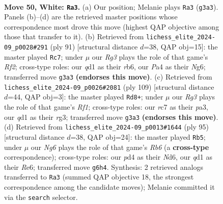 \documentclass[11pt]{article}
\begin{document}
\clearpage

\begin{figure}[p]\centering
\begin{subfigure}{0.46\textwidth}\centering
\resizebox{\linewidth}{!}{%
\newchessgame
\chessboard[
  setfen={6k1/2r3p1/1p4N1/5r2/P2pp3/6R1/5PK1/3q4 w - - 4 50},
  showmover=false,
  pgfstyle=straightmove, color=movearrow, markmove={g3-a3}
]}
\caption{}
\end{subfigure}\hfill
\begin{subfigure}{0.46\textwidth}\centering
\resizebox{\linewidth}{!}{%
\newchessgame
\chessboard[
  setfen={8/1p3rk1/pR4n1/P7/1PP5/6KP/8/8 b - - 0 46},
  showmover=false,
  pgfstyle=straightmove, color=movearrow, markmove={f7-c7}
]}
\caption{}
\end{subfigure}
\\[4pt]
\begin{subfigure}{0.46\textwidth}\centering
\resizebox{\linewidth}{!}{%
\newchessgame
\chessboard[
  setfen={5r1k/5P1p/4r3/4N2P/p2K4/P5R1/2P5/8 b - - 6 55},
  showmover=false,
  pgfstyle=straightmove, color=movearrow, markmove={f8-d8}
]}
\caption{}
\end{subfigure}\hfill
\begin{subfigure}{0.46\textwidth}\centering
\resizebox{\linewidth}{!}{%
\newchessgame
\chessboard[
  setfen={6k1/2R3p1/3nr1P1/7P/3P2R1/1r3p2/5P2/6K1 b - - 1 48},
  showmover=false,
  pgfstyle=straightmove, color=movearrow, markmove={b3-b5}
]}
\caption{}
\end{subfigure}
\caption{\textbf{Move 50, White: \texttt{Ra3}.} (a) Our position; Melanie plays \texttt{Ra3} (\texttt{g3a3}). Panels (b)--(d) are the retrieved master positions whose correspondence most drove this move (highest QAP objective among those that transfer to it). (b) Retrieved from \texttt{lichess\_elite\_2024-09\_p0028\#291} (ply 91) [structural distance $d$=38, QAP obj=15]: the master played \texttt{Rc7}; under $\mu$ our \emph{Rg3} plays the role of that game's \emph{Rf2}; cross-type roles: our \emph{q}d1 as their \emph{r}b6, our \emph{P}a4 as their \emph{N}g6; transferred move \texttt{g3a3} \textbf{(endorses this move)}. (c) Retrieved from \texttt{lichess\_elite\_2024-09\_p0026\#2081} (ply 109) [structural distance $d$=44, QAP obj=3]: the master played \texttt{Rd8+}; under $\mu$ our \emph{Rg3} plays the role of that game's \emph{Rf1}; cross-type roles: our \emph{r}c7 as their \emph{p}a3, our \emph{q}d1 as their \emph{r}g3; transferred move \texttt{g3a3} \textbf{(endorses this move)}. (d) Retrieved from \texttt{lichess\_elite\_2024-09\_p0013\#1644} (ply 95) [structural distance $d$=38, QAP obj=24]: the master played \texttt{Rb5}; under $\mu$ our \emph{Ng6} plays the role of that game's \emph{Rb6} (a \textbf{cross-type} correspondence); cross-type roles: our \emph{p}d4 as their \emph{N}d6, our \emph{q}d1 as their \emph{R}e6; transferred move \texttt{g6h4}. Synthesis: 2 retrieved analogs transferred to \texttt{Ra3} (summed QAP objective 18, the strongest correspondence among the candidate moves); Melanie committed it via the \texttt{search} selector.}
\label{fig:thought-m98}
\end{figure}
\end{document}
